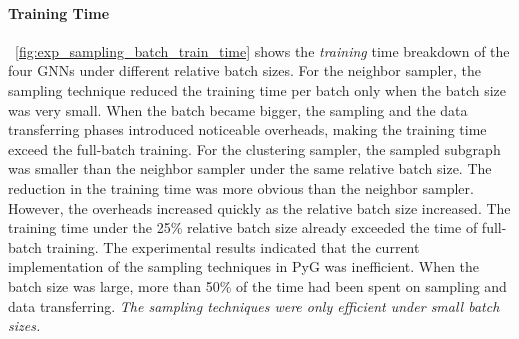 \paragraph{Training Time}

\figurename~\ref{fig:exp_sampling_batch_train_time} shows the \emph{training} time breakdown of the four GNNs under different relative batch sizes.
%
For the neighbor sampler, the sampling technique reduced the training time per batch only when the batch size was very small.
%
When the batch became bigger, the sampling and the data transferring phases introduced noticeable overheads, making the training time exceed the full-batch training.
%
For the clustering sampler, the sampled subgraph was smaller than the neighbor sampler under the same relative batch size.
%
The reduction in the training time was more obvious than the neighbor sampler.
%
However, the overheads increased quickly as the relative batch size increased.
%
The training time under the 25\% relative batch size already exceeded the time of full-batch training.
%
The experimental results indicated that the current implementation of the sampling techniques in PyG was inefficient.
%
When the batch size was large, more than 50\% of the time had been spent on sampling and data transferring.
%
\emph{The sampling techniques were only efficient under small batch sizes.}


